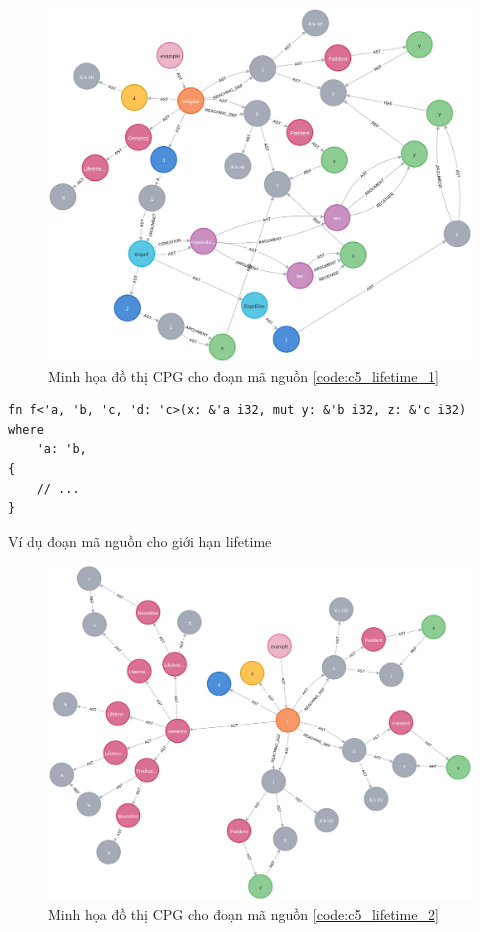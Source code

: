 \begin{figure}[H]
    \includegraphics[width=1\columnwidth]{figures/c5/c5_lifetime_1.png}
    \centering
    \caption{Minh họa đồ thị CPG cho đoạn mã nguồn \ref{code:c5_lifetime_1}}
    \label{img:c5_lifetime_1}
\end{figure}

\begin{listing}[H]
\begin{verbatim}
fn f<'a, 'b, 'c, 'd: 'c>(x: &'a i32, mut y: &'b i32, z: &'c i32)
where
    'a: 'b,
{
    // ...
}
\end{verbatim}
\caption{Ví dụ đoạn mã nguồn cho giới hạn lifetime}
\label{code:c5_lifetime_2}
\end{listing}

\begin{figure}[H]
    \includegraphics[width=1\columnwidth]{figures/c5/c5_lifetime_2.png}
    \centering
    \caption{Minh họa đồ thị CPG cho đoạn mã nguồn \ref{code:c5_lifetime_2}}
    \label{img:c5_lifetime_2}
\end{figure}
